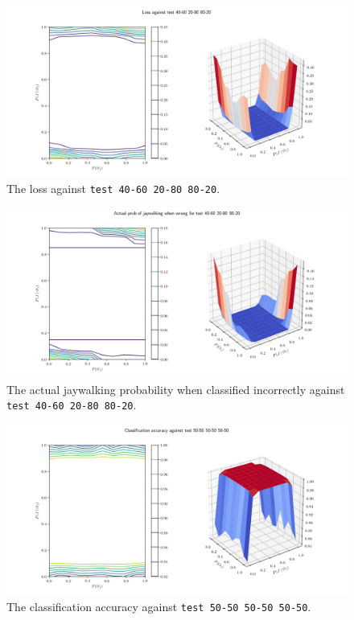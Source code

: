 \documentclass{report}
\newcommand{\code}{\texttt}
\begin{document}
\begin{figure}[h]
    \centering
    \centerline{\includegraphics[scale=0.55]{test_40-60_20-80_80-20_loss.png}}
    \caption[]{The loss against \code{test 40-60 20-80 80-20}.}
    \label{fig:test_40-60_20-80_80-20_loss_plot}
\end{figure}

\begin{figure}[h]
    \centering
    \centerline{\includegraphics[scale=0.55]{test_40-60_20-80_80-20_jay_prob.png}}
    \caption[]{The actual jaywalking probability when classified incorrectly against \code{test 40-60 20-80 80-20}.}
    \label{fig:test_40-60_20-80_80-20_jay_prob_plot}
\end{figure}

% 
% 

\begin{figure}[h]
    \centering
    \centerline{\includegraphics[scale=0.55]{test_50-50_50-50_50-50_accuracy.png}}
    \caption[]{The classification accuracy against \code{test 50-50 50-50 50-50}.}
    \label{fig:test_50-50_50-50_50-50_accuracy_plot}
\end{figure}
\end{document}
